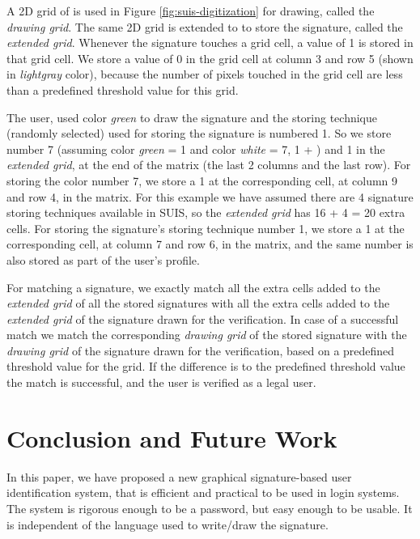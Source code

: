 \documentclass[conference]{IEEEtran}
\begin{document}
A 2D grid of  is used in Figure \ref{fig:suis-digitization} for drawing, called the \emph{drawing grid}. The same 2D grid is extended to  to store the signature, called the \emph{extended grid}. Whenever the signature touches a grid cell, a value of 1 is stored in that grid cell. We store a value of 0 in the grid cell at column 3 and row 5 (shown in \emph{lightgray} color), because the number of pixels touched in the grid cell are less than a predefined threshold value for this grid.

The user, used color \emph{green} to draw the signature and the storing technique (randomly selected) used for storing the signature is numbered 1. So we store number 7 (assuming color \emph{green} = 1 and color \emph{white} = 7, 1 + ) and 1 in the \emph{extended grid}, at the end of the matrix (the last 2 columns and the last row). For storing the color number 7, we store a 1 at the corresponding cell, at column 9 and row 4, in the matrix. For this example we have assumed there are 4 signature storing techniques available in SUIS, so the \emph{extended grid} has 16 + 4 = 20 extra cells. For storing the signature's storing technique number 1, we store a 1 at the corresponding cell, at column 7 and row 6, in the matrix, and the same number is also stored as part of the user's profile.

For matching a signature, we exactly match all the extra cells added to the \emph{extended grid} of all the stored signatures with all the extra cells added to the \emph{extended grid} of the signature drawn for the verification. In case of a successful match we match the corresponding \emph{drawing grid} of the stored signature with the \emph{drawing grid} of the signature drawn for the verification, based on a predefined threshold value for the grid. If the difference is  to the predefined threshold value the match is successful, and the user is verified as a legal user.











\section{Conclusion and Future Work}\label{sec:conclusion}

In this paper, we have proposed a new graphical signature-based user identification system, that is efficient and practical to be used in login systems. The system is rigorous enough to be a password, but easy enough to be usable. It is independent of the language used to write/draw the signature. 
\end{document}
